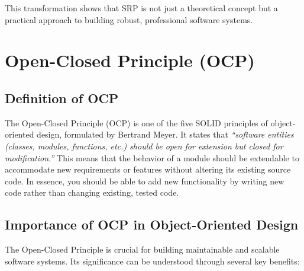 This transformation shows that SRP is not just a theoretical concept but a practical approach to building robust, professional software systems.


\section{Open-Closed Principle (OCP)}

\subsection{Definition of OCP}

The Open-Closed Principle (OCP) is one of the five SOLID principles of object-oriented design, formulated by Bertrand Meyer. It states that \textit{``software entities (classes, modules, functions, etc.) should be open for extension but closed for modification.''} This means that the behavior of a module should be extendable to accommodate new requirements or features without altering its existing source code. In essence, you should be able to add new functionality by writing new code rather than changing existing, tested code.

\subsection{Importance of OCP in Object-Oriented Design}

The Open-Closed Principle is crucial for building maintainable and scalable software systems. Its significance can be understood through several key benefits:


